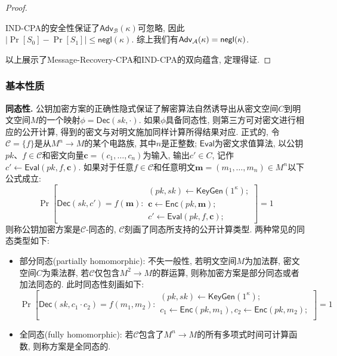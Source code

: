 \begin{proof}
\begin{trivlist}
\item IND-CPA的安全性保证了$\mathsf{Adv}_\mathcal{B}(\kappa)$可忽略, 因此$|\Pr[S_0] - \Pr[S_1]| \leq \mathsf{negl}(\kappa)$. 
综上我们有$\mathsf{Adv}_\mathcal{A}(\kappa) = \mathsf{negl}(\kappa)$. 
\end{trivlist}
以上展示了Message-Recovery-CPA和IND-CPA的双向蕴含, 定理得证. 
\end{proof}


\subsubsection{基本性质}
\begin{trivlist}
\item \textbf{同态性.} 公钥加密方案的正确性隐式保证了解密算法自然诱导出从密文空间$C$到明文空间$M$的一个映射$\phi = \mathsf{Dec}(sk, \cdot)$. 
    如果$\phi$具备同态性, 则第三方可对密文进行相应的公开计算, 得到的密文与对明文施加同样计算所得结果对应.  
    正式的, 令$\mathcal{C} = \{f\}$是从$M^n \rightarrow M$的某个电路族, 其中$n$是正整数; 
    $\mathsf{Eval}$为密文求值算法, 以公钥$pk$、$f \in \mathcal{C}$和密文向量$\mathbf{c} = (c_1, \dots, c_n)$为输入, 输出$c' \in C$, 
    记作$c' \leftarrow \mathsf{Eval}(pk, f, \mathbf{c})$. 
    如果对于任意$f \in \mathcal{C}$和任意明文$\mathbf{m} = (m_1, \dots, m_n) \in M^n$以下公式成立:
\begin{displaymath}
    \Pr \left[\mathsf{Dec}(sk, c') = f(\mathbf{m}):
    \begin{array}{l}
        (pk, sk) \leftarrow \mathsf{KeyGen}(1^\kappa);\\
        \mathbf{c} \leftarrow \mathsf{Enc}(pk, \mathbf{m});\\
        c' \leftarrow \mathsf{Eval}(pk, f, \mathbf{c});  
    \end{array} 
    \right] = 1
\end{displaymath}
则称公钥加密方案是$\mathcal{C}$-同态的, $\mathcal{C}$刻画了同态所支持的公开计算类型. 两种常见的同态类型如下: 
\begin{itemize}
\item 部分同态(partially homomorphic): 不失一般性, 若明文空间$M$为加法群, 密文空间$C$为乘法群, 若$\mathcal{C}$仅包含$M^2 \rightarrow M$的群运算, 
    则称加密方案是部分同态或者加法同态的. 此时同态性刻画如下: 
\begin{displaymath}
    \Pr \left[\mathsf{Dec}(sk, c_1 \cdot c_2) = f(m_1, m_2):
    \begin{array}{l}
        (pk, sk) \leftarrow \mathsf{KeyGen}(1^\kappa);\\
        c_1 \leftarrow \mathsf{Enc}(pk, m_1), c_2 \leftarrow \mathsf{Enc}(pk, m_2);\\
    \end{array} 
    \right] = 1
\end{displaymath} 

\item 全同态(fully homomorphic): 若$\mathcal{C}$包含了$M^n \rightarrow M$的所有多项式时间可计算函数, 则称方案是全同态的. 
\end{itemize}
\end{trivlist}


